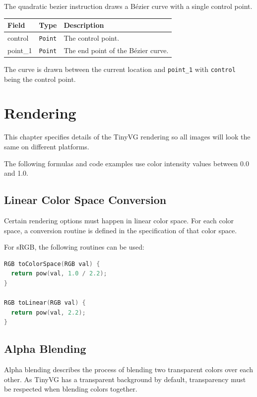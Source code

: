 \documentclass[]{article}
\begin{document}
The quadratic bezier instruction draws a Bézier curve with a single
control point.

\begin{longtable}[]{@{}p{1in}p{0.5in}p{4.5in}@{}}
\toprule
Field & Type & Description \\
\midrule
\endhead
control & \texttt{Point} & The control point. \\
point\_1 & \texttt{Point} & The end point of the Bézier curve. \\
\bottomrule
\end{longtable}

The curve is drawn between the current location and \texttt{point\_1}
with \texttt{control} being the control point.

\hypertarget{rendering}{\section{Rendering}\label{rendering}}

This chapter specifies details of the TinyVG rendering so all images will look the same on different platforms.

The following formulas and code examples use color intensity values between 0.0 and 1.0.

\hypertarget{linear-conversion}{\subsection{Linear Color Space Conversion}\label{linear-conversion}}

Certain rendering options must happen in linear color space. For each color space, a conversion routine is defined in the specification of that color space.

For sRGB, the following routines can be used:
\begin{lstlisting}[language=c]
RGB toColorSpace(RGB val) {
  return pow(val, 1.0 / 2.2);
}

RGB toLinear(RGB val) {
  return pow(val, 2.2);
}
\end{lstlisting}

\hypertarget{alpha-blending}{\subsection{Alpha Blending}\label{alpha-blending}}

Alpha blending describes the process of blending two transparent colors over each other. As TinyVG has a transparent background by default, transparency must be respected when blending colors together.
\end{document}

